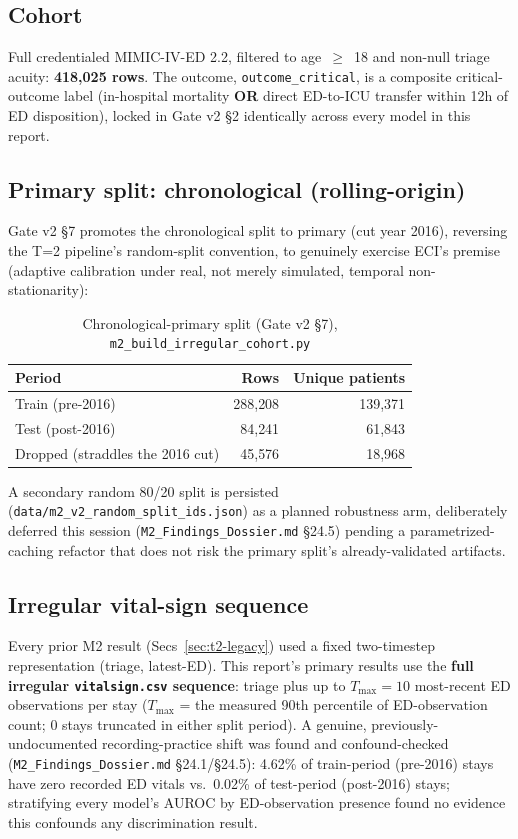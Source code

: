 \documentclass[11pt]{article}
\begin{document}
\subsection{Cohort}
Full credentialed MIMIC-IV-ED 2.2, filtered to age~$\geq$~18 and non-null triage acuity: \textbf{418{,}025 rows}. The outcome, \texttt{outcome\_critical}, is a composite critical-outcome label (in-hospital mortality \textbf{OR} direct ED-to-ICU transfer within 12h of ED disposition), locked in Gate v2 \S2 identically across every model in this report.

\subsection{Primary split: chronological (rolling-origin)}
Gate v2 \S7 promotes the chronological split to primary (cut year 2016), reversing the T=2 pipeline's random-split convention, to genuinely exercise ECI's premise (adaptive calibration under real, not merely simulated, temporal non-stationarity):

\begin{table}[H]
\centering
\caption{Chronological-primary split (Gate v2 \S7), \texttt{m2\_build\_irregular\_cohort.py}}
\begin{tabular}{lrr}
\toprule
Period & Rows & Unique patients \\
\midrule
Train (pre-2016) & 288{,}208 & 139{,}371 \\
Test (post-2016) & 84{,}241 & 61{,}843 \\
Dropped (straddles the 2016 cut) & 45{,}576 & 18{,}968 \\
\bottomrule
\end{tabular}
\end{table}

A secondary random 80/20 split is persisted (\texttt{data/m2\_v2\_random\_split\_ids.json}) as a planned robustness arm, deliberately deferred this session (\texttt{M2\_Findings\_Dossier.md} \S24.5) pending a parametrized-caching refactor that does not risk the primary split's already-validated artifacts.

\subsection{Irregular vital-sign sequence}
Every prior M2 result (Secs~\ref{sec:t2-legacy}) used a fixed two-timestep representation (triage, latest-ED). This report's primary results use the \textbf{full irregular \texttt{vitalsign.csv} sequence}: triage plus up to $T_{\max}=10$ most-recent ED observations per stay ($T_{\max}$ = the measured 90th percentile of ED-observation count; 0 stays truncated in either split period). A genuine, previously-undocumented recording-practice shift was found and confound-checked (\texttt{M2\_Findings\_Dossier.md} \S24.1/\S24.5): 4.62\% of train-period (pre-2016) stays have zero recorded ED vitals vs.\ 0.02\% of test-period (post-2016) stays; stratifying every model's AUROC by ED-observation presence found no evidence this confounds any discrimination result.
\end{document}
